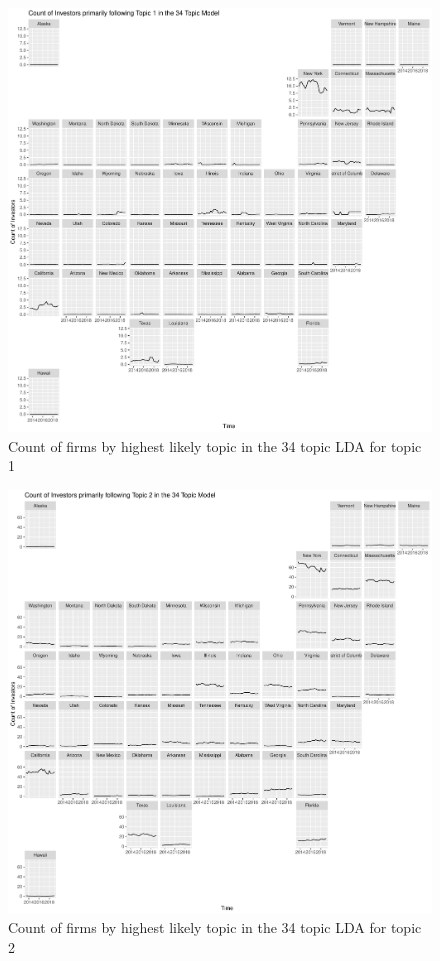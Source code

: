 	\begin{figure}
		\centering
		\includegraphics[width=1\linewidth]{Figures/ChapterV/USA_34_Topic01.pdf}
		\caption[Count of Firms for Topic 1 by Quarter]{Count of firms by highest likely topic in the 34 topic LDA for topic 1}
		\label{fig:StateLDA1}
	\end{figure}
	
	\begin{figure}
		\centering
		\includegraphics[width=1\linewidth]{Figures/ChapterV/USA_34_Topic02.pdf}
		\caption[Count of Firms for Topic 2 by Quarter]{Count of firms by highest likely topic in the 34 topic LDA for topic 2}
		\label{fig:StateLDA2}
	\end{figure}
	

